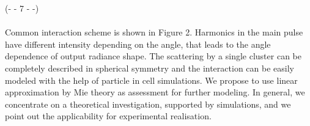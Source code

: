 \noindent(- - 7 - -)\\~\\
Common interaction scheme is shown in Figure 2. Harmonics in the main pulse have different intensity depending on the angle, that leads to the angle dependence of output radiance shape. The scattering by a single cluster can be completely described in spherical symmetry and the interaction can be easily modeled with the help of particle in cell simulations. We propose to use linear approximation by Mie theory as assessment for further modeling. In general, we concentrate on a theoretical investigation, supported by simulations, and we point out the applicability for experimental realisation.
